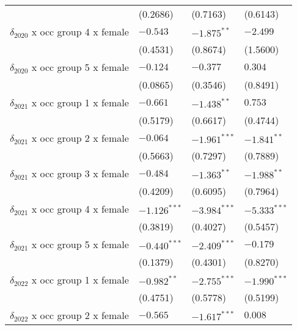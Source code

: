\begin{tabular}{llll}
                                       &           (0.2686) &           (0.7163) &           (0.6143) \\
$\delta_{2020}$ x occ group 4 x female &           $-0.543$ &      $-1.875^{**}$ &           $-2.499$ \\
                                       &           (0.4531) &           (0.8674) &           (1.5600) \\
$\delta_{2020}$ x occ group 5 x female &           $-0.124$ &           $-0.377$ &            $0.304$ \\
                                       &           (0.0865) &           (0.3546) &           (0.8491) \\
$\delta_{2021}$ x occ group 1 x female &           $-0.661$ &      $-1.438^{**}$ &            $0.753$ \\
                                       &           (0.5179) &           (0.6617) &           (0.4744) \\
$\delta_{2021}$ x occ group 2 x female &           $-0.064$ &     $-1.961^{***}$ &      $-1.841^{**}$ \\
                                       &           (0.5663) &           (0.7297) &           (0.7889) \\
$\delta_{2021}$ x occ group 3 x female &           $-0.484$ &      $-1.363^{**}$ &      $-1.988^{**}$ \\
                                       &           (0.4209) &           (0.6095) &           (0.7964) \\
$\delta_{2021}$ x occ group 4 x female &     $-1.126^{***}$ &     $-3.984^{***}$ &     $-5.333^{***}$ \\
                                       &           (0.3819) &           (0.4027) &           (0.5457) \\
$\delta_{2021}$ x occ group 5 x female &     $-0.440^{***}$ &     $-2.409^{***}$ &           $-0.179$ \\
                                       &           (0.1379) &           (0.4301) &           (0.8270) \\
$\delta_{2022}$ x occ group 1 x female &      $-0.982^{**}$ &     $-2.755^{***}$ &     $-1.990^{***}$ \\
                                       &           (0.4751) &           (0.5778) &           (0.5199) \\
$\delta_{2022}$ x occ group 2 x female &           $-0.565$ &     $-1.617^{***}$ &            $0.008$ \\

\end{tabular}
